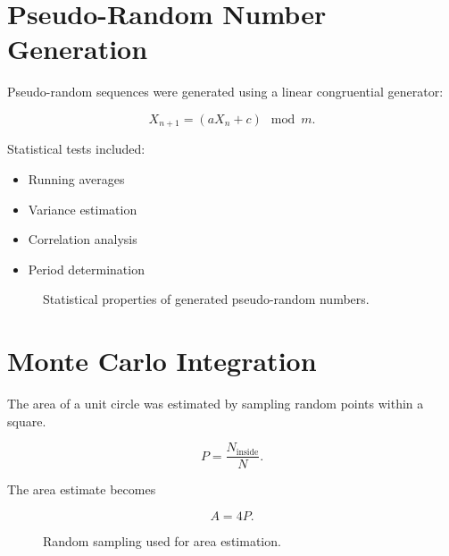 \documentclass[a4paper]{article}
\begin{document}
\section{Pseudo-Random Number Generation}

Pseudo-random sequences were generated using a linear congruential generator:

\begin{equation}
X_{n+1}
=
(aX_n+c)\mod m.
\end{equation}

Statistical tests included:

\begin{itemize}
    \item Running averages
    \item Variance estimation
    \item Correlation analysis
    \item Period determination
\end{itemize}

\begin{figure}[H]
\centering
{}
\caption{Statistical properties of generated pseudo-random numbers.}
\end{figure}

\section{Monte Carlo Integration}

The area of a unit circle was estimated by sampling random points within a square.

\begin{equation}
P
=
\frac{N_{\mathrm{inside}}}{N}.
\end{equation}

The area estimate becomes

\begin{equation}
A
=
4P.
\end{equation}

\begin{figure}[H]
\centering
{}
\caption{Random sampling used for area estimation.}
\end{figure}

\end{document}
